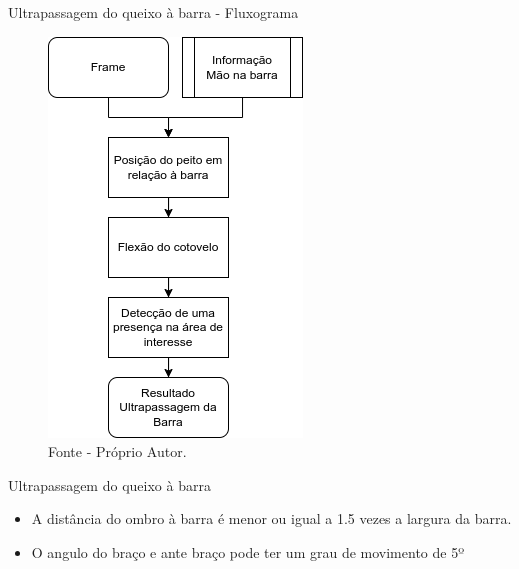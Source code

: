 \begin{frame}{Ultrapassagem do queixo à barra - Fluxograma}
    \begin{figure}[!ht]
        \centering
            \includegraphics[scale=0.42]{img/desenvolvimento/ultrapassagemBarra/fluxograma.png}
        \caption*{Fonte - Próprio Autor.}
    \end{figure}
\end{frame}

\begin{frame}{Ultrapassagem do queixo à barra}
    \begin{itemize}
        \item A distância do ombro à barra é menor ou igual a 1.5 vezes a largura da barra.
        \item O angulo do braço e ante braço pode ter um grau de movimento de 5º
    \end{itemize}
\end{frame}


